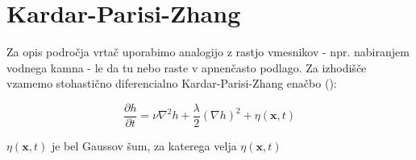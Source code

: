 \documentclass[a4paper, oneside, 12pt]{book}
\begin{document}

        \section{Kardar-Parisi-Zhang}
        Za opis področja vrtač uporabimo analogijo z rastjo vmesnikov - npr. nabiranjem vodnega kamna - le da tu nebo raste v apnenčasto podlago.
        Za izhodišče vzamemo stohastično diferencialno Kardar-Parisi-Zhang enačbo (\cite{kardar1986dynamic}):

        \begin{equation}
          \frac{\partial h}{\partial t} = \nu \nabla^2 h + \frac{\lambda}{2} (\nabla h)^2 + \eta (\mathbf{x},t)
          \label{KPZ}
        \end{equation}

        $\eta(\mathbf{x},t)$ je bel Gaussov šum, za katerega velja $\eta(\mathbf{x},t)$ 
\end{document}

